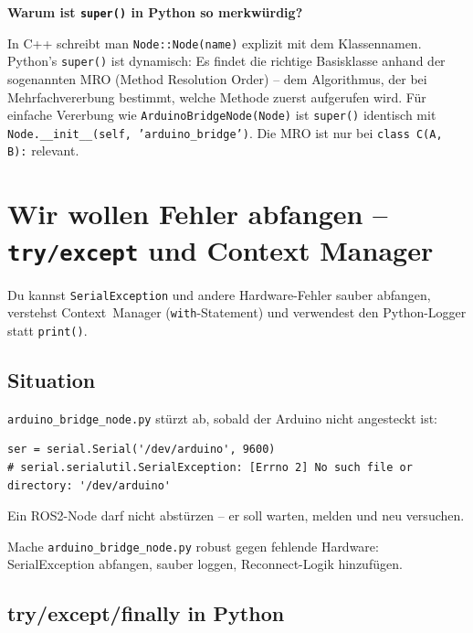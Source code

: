 \begin{haubeBox}
\textbf{Warum ist \texttt{super()} in Python so merkwürdig?}

In C++ schreibt man \texttt{Node::Node(name)} explizit mit dem Klassennamen.
Python's \texttt{super()} ist dynamisch: Es findet die richtige Basisklasse
anhand der sogenannten MRO (Method Resolution Order) -- dem Algorithmus,
der bei Mehrfachvererbung bestimmt, welche Methode zuerst aufgerufen wird.
Für einfache Vererbung wie \texttt{ArduinoBridgeNode(Node)} ist \texttt{super()}
identisch mit \texttt{Node.\_\_init\_\_(self, 'arduino\_bridge')}.
Die MRO ist nur bei \texttt{class C(A, B):} relevant.
\end{haubeBox}


\chapter{Wir wollen Fehler abfangen – \texttt{try/except} und Context Manager}

\begin{lernziele}
Du kannst \texttt{SerialException} und andere Hardware-Fehler sauber abfangen,
verstehst Context~Manager (\texttt{with}-Statement) und
verwendest den Python-Logger statt \texttt{print()}.
\end{lernziele}

\section{Situation}

\texttt{arduino\_bridge\_node.py} stürzt ab,
sobald der Arduino nicht angesteckt ist:

\begin{lstlisting}
ser = serial.Serial('/dev/arduino', 9600)
# serial.serialutil.SerialException: [Errno 2] No such file or directory: '/dev/arduino'
\end{lstlisting}

Ein ROS2-Node darf nicht abstürzen -- er soll warten, melden und neu versuchen.

\begin{aufgabeBox}
Mache \texttt{arduino\_bridge\_node.py} robust gegen fehlende Hardware:
SerialException abfangen, sauber loggen, Reconnect-Logik hinzufügen.
\end{aufgabeBox}

\section{try/except/finally in Python}

